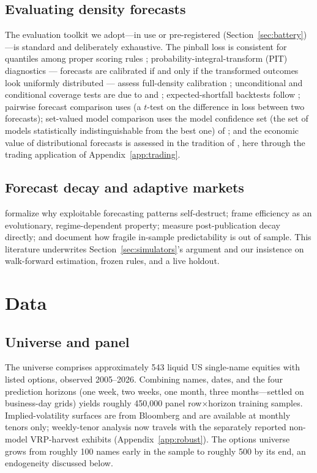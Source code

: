 \documentclass[11pt]{article}
\begin{document}
\subsection{Evaluating density forecasts}
The evaluation toolkit we adopt---in use or pre-registered (Section~\ref{sec:battery})---is standard and deliberately exhaustive. The pinball loss is consistent for quantiles among proper scoring rules \citep{gneitingraftery2007}; probability-integral-transform (PIT) diagnostics --- forecasts are calibrated if and only if the transformed outcomes look uniformly distributed --- assess full-density calibration \citep{dieboldgunthertay1998}; unconditional and conditional coverage tests are due to \citet{kupiec1995} and \citet{christoffersen1998}; expected-shortfall backtests follow \citet{acerbiszekely2014}; pairwise forecast comparison uses \citet{dieboldmariano1995} (a $t$-test on the difference in loss between two forecasts); set-valued model comparison uses the model confidence set (the set of models statistically indistinguishable from the best one) of \citet{hansen2011mcs}; and the economic value of distributional forecasts is assessed in the tradition of \citet{fleming2001}, here through the trading application of Appendix~\ref{app:trading}.

\subsection{Forecast decay and adaptive markets}
\citet{timmermanngranger2004} formalize why exploitable forecasting patterns self-destruct; \citet{lo2004, lo2017} frame efficiency as an evolutionary, regime-dependent property; \citet{mcleanpontiff2016} measure post-publication decay directly; and \citet{welchgoyal2008} document how fragile in-sample predictability is out of sample. This literature underwrites Section~\ref{sec:simulators}'s argument and our insistence on walk-forward estimation, frozen rules, and a live holdout.

\section{Data}\label{sec:data}

\subsection{Universe and panel}
The universe comprises approximately 543 liquid US single-name equities with listed options, observed 2005--2026. Combining names, dates, and the four prediction horizons (one week, two weeks, one month, three months---settled on business-day grids) yields roughly 450{,}000 panel row$\times$horizon training samples. Implied-volatility surfaces are from Bloomberg and are available at monthly tenors only; weekly-tenor analysis now travels with the separately reported non-model VRP-harvest exhibits (Appendix~\ref{app:robust}). The options universe grows from roughly 100 names early in the sample to roughly 500 by its end, an endogeneity discussed below.
\end{document}
